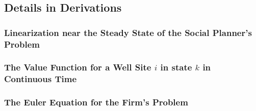 \subsection{Details in Derivations}
\label{C3-Appendix_Derivations}


\subsubsection{Linearization near the Steady State of the Social Planner's Problem}
\label{C3-Appendix_Derivations_Linearization-near-the-Steady-State-of-the-Social-Planners-Problem}


\subsubsection{The Value Function for a Well Site $i$ in state $k$ in Continuous Time}
\label{C3-Appendix_Derivations_Value-Function-in-Continuous-Time}


\subsubsection{The Euler Equation for the Firm's Problem}
\label{C3-Appendix_Derivations_Euler-Equation-for-the-Firms-Problem}




\clearpage
